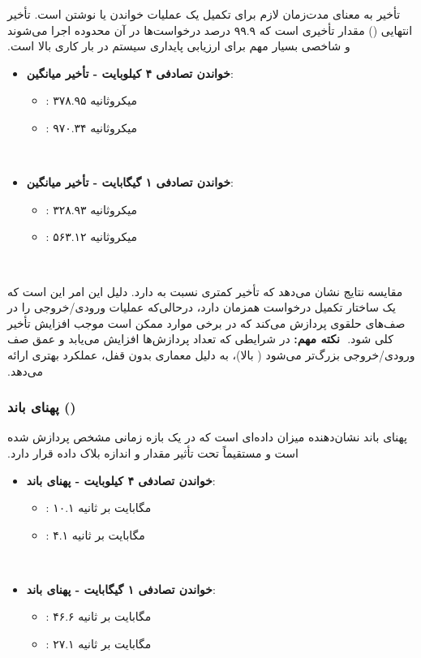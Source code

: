 ‫
‫تأخیر به معنای مدت‌زمان لازم برای تکمیل یک عملیات خواندن یا نوشتن است. تأخیر انتهایی () مقدار تأخیری است که ۹۹.۹ درصد درخواست‌ها در آن محدوده اجرا می‌شوند و شاخصی بسیار مهم برای ارزیابی پایداری سیستم در بار کاری بالا است.
‫
‫\begin{itemize}
‫	\item \textbf{خواندن تصادفی ۴ کیلوبایت - تأخیر میانگین}:
‫	\begin{itemize}
‫		\item {}: ۳۷۸.۹۵ میکروثانیه
‫		\item {}: ۹۷۰.۳۴ میکروثانیه
‫	\end{itemize}
‫	\item \textbf{خواندن تصادفی ۱ گیگابایت - تأخیر میانگین}:
‫	\begin{itemize}
‫		\item {}: ۳۲۸.۹۳ میکروثانیه
‫		\item {}: ۵۶۳.۱۲ میکروثانیه
‫	\end{itemize}
‫\end{itemize}
‫
‫مقایسه نتایج نشان می‌دهد که  تأخیر کمتری نسبت به  دارد. دلیل این امر این است که  یک ساختار تکمیل درخواست همزمان دارد، درحالی‌که  عملیات ورودی/خروجی را در صف‌های حلقوی پردازش می‌کند که در برخی موارد ممکن است موجب افزایش تأخیر کلی شود.
‫
‫\textbf{نکته مهم:} در شرایطی که تعداد پردازش‌ها افزایش می‌یابد و عمق صف ورودی/خروجی بزرگ‌تر می‌شود ( بالا)،  به دلیل معماری بدون قفل، عملکرد بهتری ارائه می‌دهد.
‫
‫\subsubsection*{پهنای باند ()}
‫
‫پهنای باند نشان‌دهنده میزان داده‌ای است که در یک بازه زمانی مشخص پردازش شده است و مستقیماً تحت تأثیر مقدار  و اندازه بلاک داده قرار دارد.
‫
‫\begin{itemize}
‫	\item \textbf{خواندن تصادفی ۴ کیلوبایت - پهنای باند}:
‫	\begin{itemize}
‫		\item {}: ۱۰.۱ مگابایت بر ثانیه
‫		\item {}: ۴.۱ مگابایت بر ثانیه
‫	\end{itemize}
‫	\item \textbf{خواندن تصادفی ۱ گیگابایت - پهنای باند}:
‫	\begin{itemize}
‫		\item {}: ۴۶.۶ مگابایت بر ثانیه
‫		\item {}: ۲۷.۱ مگابایت بر ثانیه
‫	\end{itemize}
‫\end{itemize}
